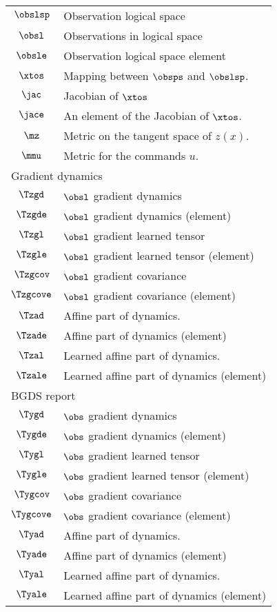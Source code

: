 \begin{longtable}{cl}
 \hline
$\obslsp$ &  Observation logical space\\ 
 $\obsl$ &  Observations in logical space\\ 
 $\obsle$ &  Observation logical space element\\ 
 $\xtos$ &  Mapping between $\obsps$ and $\obslsp$.\\ 
 $\jac$ &  Jacobian of $\xtos$\\ 
 $\jace$ &  An element of the Jacobian of $\xtos$.\\ 
 $\mz$ &  Metric on the tangent space of $z(x)$.\\ 
 $\mmu$ &  Metric for the commands $u$. \\ 
 \multicolumn{2}{l}{Gradient dynamics}\\ 
 \hline
$\Tzgd$ &  $\obsl$  gradient dynamics\\ 
 $\Tzgde$ &  $\obsl$  gradient dynamics (element)\\ 
 $\Tzgl$ &  $\obsl$  gradient  learned tensor \\ 
 $\Tzgle$ &  $\obsl$  gradient  learned tensor (element)\\ 
 $\Tzgcov$ &  $\obsl$  gradient  covariance\\ 
 $\Tzgcove$ &  $\obsl$  gradient  covariance (element)\\ 
 $\Tzad$ &  Affine part of dynamics.\\ 
 $\Tzade$ &  Affine part of dynamics (element)\\ 
 $\Tzal$ &  Learned affine part of dynamics.\\ 
 $\Tzale$ &  Learned affine part of dynamics (element)\\ 
 \multicolumn{2}{l}{BGDS report}\\ 
 \hline
$\Tygd$ &  $\obs$ gradient dynamics\\ 
 $\Tygde$ &  $\obs$ gradient dynamics (element)\\ 
 $\Tygl$ &  $\obs$ gradient learned tensor \\ 
 $\Tygle$ &  $\obs$ gradient learned tensor (element)\\ 
 $\Tygcov$ &  $\obs$ gradient covariance\\ 
 $\Tygcove$ &  $\obs$ gradient covariance (element)\\ 
 $\Tyad$ &  Affine part of dynamics.\\ 
 $\Tyade$ &  Affine part of dynamics (element)\\ 
 $\Tyal$ &  Learned affine part of dynamics.\\ 
 $\Tyale$ &  Learned affine part of dynamics (element)\\ 

\end{longtable}
